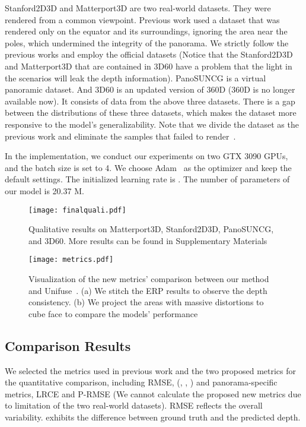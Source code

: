\documentclass[runningheads]{llncs}
\begin{document}
Stanford2D3D and Matterport3D are two real-world datasets. They were rendered from a common viewpoint. Previous work used a dataset that was rendered only on the equator and its surroundings, ignoring the area near the poles, which undermined the integrity of the panorama. 
We strictly follow the previous works and employ the official datasets (Notice that the Stanford2D3D and Matterport3D that are contained in 3D60 have a problem that the light in the scenarios will leak the depth information).
PanoSUNCG is a virtual panoramic dataset. And 3D60 is an updated version of 360D (360D is no longer available now). It consists of data from the above three datasets. There is a gap between the distributions of these three datasets, which makes the dataset more responsive to the model's generalizability. Note that we divide the dataset as the previous work and eliminate the samples that failed to render~\cite{chen2021distortion,wang2020bifuse}.

In the implementation, we conduct our experiments on two GTX 3090 GPUs, and the batch size is set to 4. We choose Adam~\cite{kingma2014adam} as the optimizer and keep the default settings. The initialized learning rate is . The number of parameters of our model is 20.37 M.
\begin{figure}[t]
  \centering
  \texttt{[image: finalquali.pdf]} \caption{Qualitative results on Matterport3D, Stanford2D3D, PanoSUNCG, and 3D60. More results can be found in Supplementary Materials} \label{fig:cp2}
\end{figure}
\begin{figure}[!t]
  \centering
  \texttt{[image: metrics.pdf]} \caption{Visualization of the new metrics' comparison between our method and Unifuse~\cite{jiang2021unifuse}. (a) We stitch the ERP results to observe the depth consistency. (b) We project the areas with massive distortions to cube face to compare the models' performance} \label{fig:metrics}
\end{figure}
\subsection{Comparison Results}
We selected the metrics used in previous work and the two proposed metrics for the quantitative comparison, including RMSE, (, , ) and panorama-specific metrics, LRCE and P-RMSE (We cannot calculate the proposed new metrics due to limitation of the two real-world datasets). RMSE reflects the overall variability.  exhibits the difference between ground truth and the predicted depth. 
\end{document}
